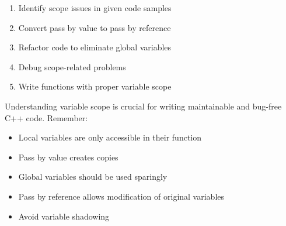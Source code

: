 \documentclass{article}
\begin{document}
\begin{enumerate}
    \item Identify scope issues in given code samples
    \item Convert pass by value to pass by reference
    \item Refactor code to eliminate global variables
    \item Debug scope-related problems
    \item Write functions with proper variable scope
\end{enumerate}

\begin{tcolorbox}[title=Summary]
Understanding variable scope is crucial for writing maintainable and bug-free C++ code. Remember:
\begin{itemize}
    \item Local variables are only accessible in their function
    \item Pass by value creates copies
    \item Global variables should be used sparingly
    \item Pass by reference allows modification of original variables
    \item Avoid variable shadowing
\end{itemize}
\end{tcolorbox}
\end{document}
